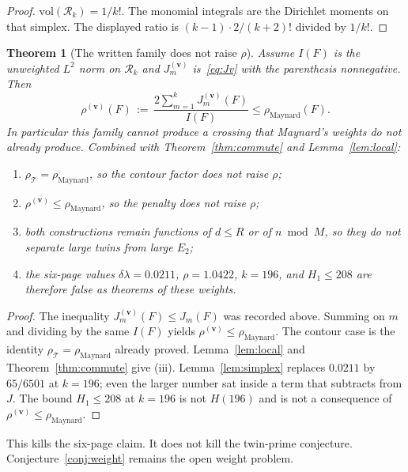 \documentclass[11pt,a4paper]{article}
\theoremstyle{plain}
\newtheorem{theorem}{Theorem}
\theoremstyle{definition}
\theoremstyle{plain}
\numberwithin{equation}{section}
\begin{document}
\begin{proof}
\(\mathrm{vol}(\mathcal{R}_k)=1/k!\). The monomial integrals are the Dirichlet moments on that simplex. The displayed ratio is \((k-1)\cdot 2/(k+2)!\) divided by \(1/k!\).
\end{proof}

\begin{theorem}[The written family does not raise \(\rho\)]
\label{thm:kill}
Assume \(I(F)\) is the unweighted \(L^2\) norm on \(\mathcal{R}_k\) and \(J_m^{(\mathbf{v})}\) is~\eqref{eq:Jv} with the parenthesis nonnegative. Then
\[
\rho^{(\mathbf{v})}(F)\,:=\,\frac{2\sum_{m=1}^{k}J_m^{(\mathbf{v})}(F)}{I(F)}
\le
\rho_{\mathrm{Maynard}}(F).
\]
In particular this family cannot produce a crossing that Maynard's weights do not already produce. Combined with Theorem~\ref{thm:commute} and Lemma~\ref{lem:local}:
\begin{enumerate}
\item \(\rho_{\mathcal{T}}=\rho_{\mathrm{Maynard}}\), so the contour factor does not raise \(\rho\);
\item \(\rho^{(\mathbf{v})}\le\rho_{\mathrm{Maynard}}\), so the penalty does not raise \(\rho\);
\item both constructions remain functions of \(d\le R\) or of \(n\bmod M\), so they do not separate large twins from large \(E_2\);
\item the six-page values \(\delta\lambda=0.0211\), \(\rho=1.0422\), \(k=196\), and \(H_1\le 208\) are therefore false as theorems of these weights.
\end{enumerate}
\end{theorem}

\begin{proof}
The inequality \(J_m^{(\mathbf{v})}(F)\le J_m(F)\) was recorded above. Summing on \(m\) and dividing by the same \(I(F)\) yields \(\rho^{(\mathbf{v})}\le\rho_{\mathrm{Maynard}}\). The contour case is the identity \(\rho_{\mathcal{T}}=\rho_{\mathrm{Maynard}}\) already proved. Lemma~\ref{lem:local} and Theorem~\ref{thm:commute} give (iii). Lemma~\ref{lem:simplex} replaces \(0.0211\) by \(65/6501\) at \(k=196\); even the larger number sat inside a term that subtracts from \(J\). The bound \(H_1\le 208\) at \(k=196\) is not \(H(196)\) and is not a consequence of \(\rho^{(\mathbf{v})}\le\rho_{\mathrm{Maynard}}\).
\end{proof}

This kills the six-page claim. It does not kill the twin-prime conjecture. Conjecture~\ref{conj:weight} remains the open weight problem.
\end{document}
